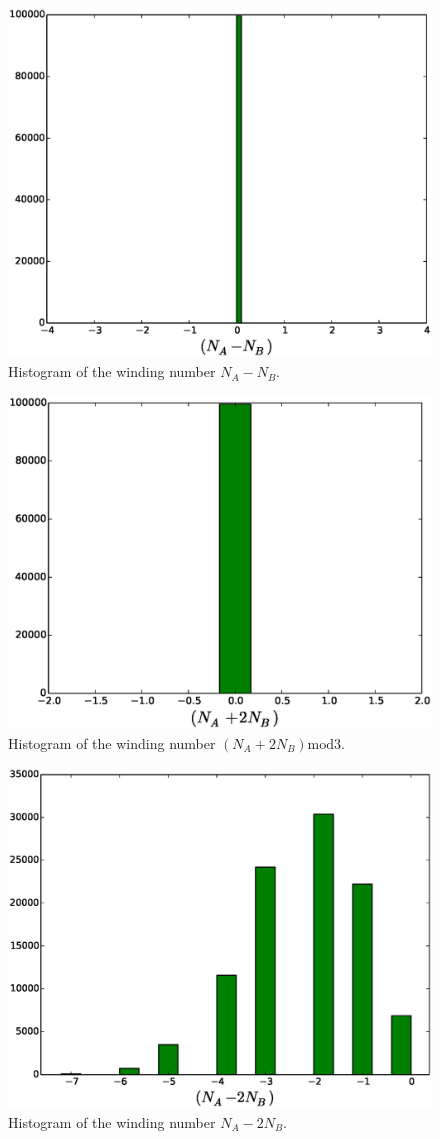 \documentclass[aps,floatfix,11pt]{revtex4-1}
\begin{document}
\begin{figure}[h]
    \centering
    \includegraphics[width=8.5 cm]{W_vrt_NAmNB_dmr_dmr_mdl}
    \caption{Histogram of the winding number $N_A - N_B$.\label{}}
\end{figure}

\begin{figure}[h]
    \centering
    \includegraphics[width=8.5 cm]{W_vrt_NAp2NB_dmr_dmr_mdl}
    \caption{Histogram of the winding number $(N_A + 2N_B)\mathrm{mod}3$.\label{}}
\end{figure}

\begin{figure}[h]
    \centering
    \includegraphics[width=8.5 cm]{W_vrt_NAm2NB_dmr_dmr_mdl}
    \caption{Histogram of the winding number $N_A - 2N_B$.\label{}}
\end{figure}
\end{document}
